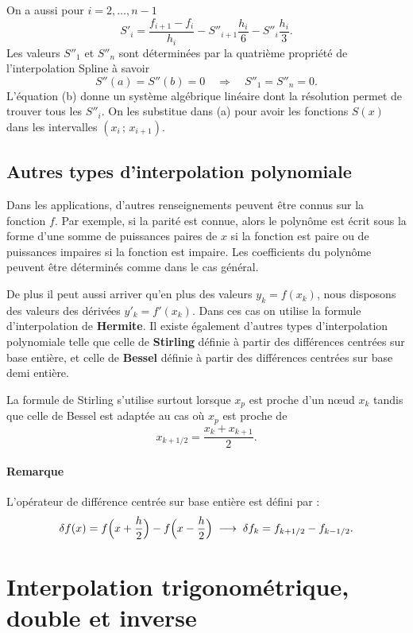 On a aussi pour $i = 2, \dots, n-1$
\[
  S'_i = \frac{f_{i+1} - f_i}{h_i} - S''_{i+1}\frac{h_i}{6} - S''_i\frac{h_i}{3} .
\]
Les valeurs $S''_1$ et $S''_n$ sont déterminées par la quatrième propriété de
l'interpolation Spline à savoir
\[
  S''(a) = S''(b) = 0 \quad\Longrightarrow\quad S''_1 = S''_n = 0 .
\]
L'équation (b) donne un système algébrique linéaire dont la résolution permet
de trouver tous les $S''_i$. On les substitue dans (a) pour avoir les
fonctions $S(x)$ dans les intervalles $(x_i\,;\,x_{i+1})$.

\subsection{Autres types d'interpolation polynomiale}

Dans les applications, d'autres renseignements peuvent être connus sur la
fonction $f$. Par exemple, si la parité est connue, alors le polynôme est écrit
sous la forme d'une somme de puissances paires de $x$ si la fonction est paire
ou de puissances impaires si la fonction est impaire. Les coefficients du
polynôme peuvent être déterminés comme dans le cas général.

De plus il peut aussi arriver qu'en plus des valeurs $y_k = f(x_k)$, nous
disposons des valeurs des dérivées $y'_k = f'(x_k)$. Dans ces cas on utilise
la formule d'interpolation de \textbf{Hermite}. Il existe également d'autres
types d'interpolation polynomiale telle que celle de \textbf{Stirling} définie
à partir des différences centrées sur base entière, et celle de
\textbf{Bessel} définie à partir des différences centrées sur base demi
entière.

La formule de Stirling s'utilise surtout lorsque $x_p$ est proche d'un n\oe ud
$x_k$ tandis que celle de Bessel est adaptée au cas où $x_p$ est proche de
\[
  x_{k+1/2} = \frac{x_k + x_{k+1}}{2} .
\]

\paragraph{Remarque} L'opérateur de différence centrée sur base entière est
défini par :
\[
  \delta f(x) = f\Bigl(x + \frac{h}{2}\Bigr) - f\Bigl(x - \frac{h}{2}\Bigr)
  \;\longrightarrow\;
  \delta f_k = f_{k+1/2} - f_{k-1/2} .
\]

\section{Interpolation trigonométrique, double et inverse}

